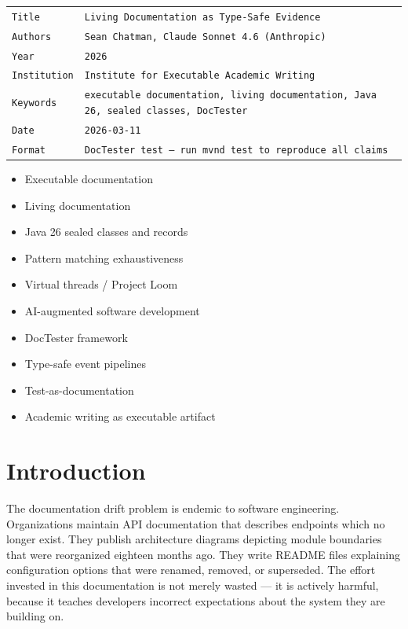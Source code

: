 \documentclass[11pt]{article}
\begin{document}
\begin{table}[h]
\centering
\begin{tabular}{|l|l|}
\hline
\texttt{Title} & \texttt{Living Documentation as Type-Safe Evidence} \\
\texttt{Authors} & \texttt{Sean Chatman, Claude Sonnet 4.6 (Anthropic)} \\
\texttt{Year} & \texttt{2026} \\
\texttt{Institution} & \texttt{Institute for Executable Academic Writing} \\
\texttt{Keywords} & \texttt{executable documentation, living documentation, Java 26, sealed classes, DocTester} \\
\texttt{Date} & \texttt{2026-03-11} \\
\texttt{Format} & \texttt{DocTester test — run mvnd test to reproduce all claims} \\
\hline
\end{tabular}
\end{table}


\begin{itemize}
\item Executable documentation
\item Living documentation
\item Java 26 sealed classes and records
\item Pattern matching exhaustiveness
\item Virtual threads / Project Loom
\item AI-augmented software development
\item DocTester framework
\item Type-safe event pipelines
\item Test-as-documentation
\item Academic writing as executable artifact
\end{itemize}


\section{Introduction}

The documentation drift problem is endemic to software engineering. Organizations maintain API documentation that describes endpoints which no longer exist. They publish architecture diagrams depicting module boundaries that were reorganized eighteen months ago. They write README files explaining configuration options that were renamed, removed, or superseded. The effort invested in this documentation is not merely wasted — it is actively harmful, because it teaches developers incorrect expectations about the system they are building on.
\end{document}
